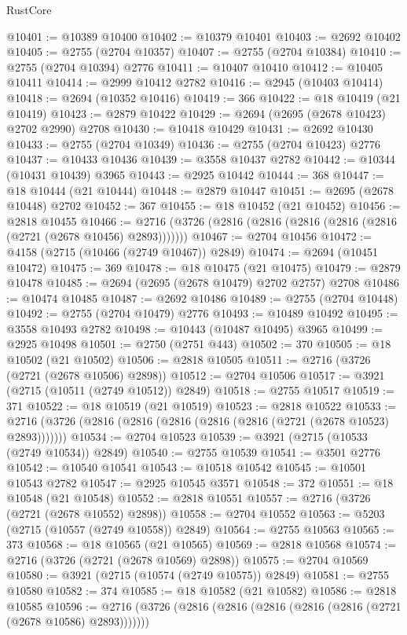\begin{lexlean}{RustCore}
\begin{coremodule}
@10401 := @10389 @10400
@10402 := @10379 @10401
@10403 := @2692 @10402
@10405 := @2755 (@2704 @10357)
@10407 := @2755 (@2704 @10384)
@10410 := @2755 (@2704 @10394) @2776
@10411 := @10407 @10410
@10412 := @10405 @10411
@10414 := @2999 @10412 @2782
@10416 := @2945 (@10403 @10414)
@10418 := @2694 (@10352 @10416)
@10419 := 366
@10422 := @18 @10419 (@21 @10419)
@10423 := @2879 @10422
@10429 := @2694 (@2695 (@2678 @10423) @2702 @2990) @2708
@10430 := @10418 @10429
@10431 := @2692 @10430
@10433 := @2755 (@2704 @10349)
@10436 := @2755 (@2704 @10423) @2776
@10437 := @10433 @10436
@10439 := @3558 @10437 @2782
@10442 := @10344 (@10431 @10439) @3965
@10443 := @2925 @10442
@10444 := 368
@10447 := @18 @10444 (@21 @10444)
@10448 := @2879 @10447
@10451 := @2695 (@2678 @10448) @2702
@10452 := 367
@10455 := @18 @10452 (@21 @10452)
@10456 := @2818 @10455
@10466 := @2716 (@3726 (@2816 (@2816 (@2816 (@2816 (@2816 (@2721 (@2678 @10456) @2893)))))))
@10467 := @2704 @10456
@10472 := @4158 (@2715 (@10466 (@2749 @10467)) @2849)
@10474 := @2694 (@10451 @10472)
@10475 := 369
@10478 := @18 @10475 (@21 @10475)
@10479 := @2879 @10478
@10485 := @2694 (@2695 (@2678 @10479) @2702 @2757) @2708
@10486 := @10474 @10485
@10487 := @2692 @10486
@10489 := @2755 (@2704 @10448)
@10492 := @2755 (@2704 @10479) @2776
@10493 := @10489 @10492
@10495 := @3558 @10493 @2782
@10498 := @10443 (@10487 @10495) @3965
@10499 := @2925 @10498
@10501 := @2750 (@2751 @443)
@10502 := 370
@10505 := @18 @10502 (@21 @10502)
@10506 := @2818 @10505
@10511 := @2716 (@3726 (@2721 (@2678 @10506) @2898))
@10512 := @2704 @10506
@10517 := @3921 (@2715 (@10511 (@2749 @10512)) @2849)
@10518 := @2755 @10517
@10519 := 371
@10522 := @18 @10519 (@21 @10519)
@10523 := @2818 @10522
@10533 := @2716 (@3726 (@2816 (@2816 (@2816 (@2816 (@2816 (@2721 (@2678 @10523) @2893)))))))
@10534 := @2704 @10523
@10539 := @3921 (@2715 (@10533 (@2749 @10534)) @2849)
@10540 := @2755 @10539
@10541 := @3501 @2776
@10542 := @10540 @10541
@10543 := @10518 @10542
@10545 := @10501 @10543 @2782
@10547 := @2925 @10545 @3571
@10548 := 372
@10551 := @18 @10548 (@21 @10548)
@10552 := @2818 @10551
@10557 := @2716 (@3726 (@2721 (@2678 @10552) @2898))
@10558 := @2704 @10552
@10563 := @5203 (@2715 (@10557 (@2749 @10558)) @2849)
@10564 := @2755 @10563
@10565 := 373
@10568 := @18 @10565 (@21 @10565)
@10569 := @2818 @10568
@10574 := @2716 (@3726 (@2721 (@2678 @10569) @2898))
@10575 := @2704 @10569
@10580 := @3921 (@2715 (@10574 (@2749 @10575)) @2849)
@10581 := @2755 @10580
@10582 := 374
@10585 := @18 @10582 (@21 @10582)
@10586 := @2818 @10585
@10596 := @2716 (@3726 (@2816 (@2816 (@2816 (@2816 (@2816 (@2721 (@2678 @10586) @2893)))))))

\end{coremodule}
\end{lexlean}
